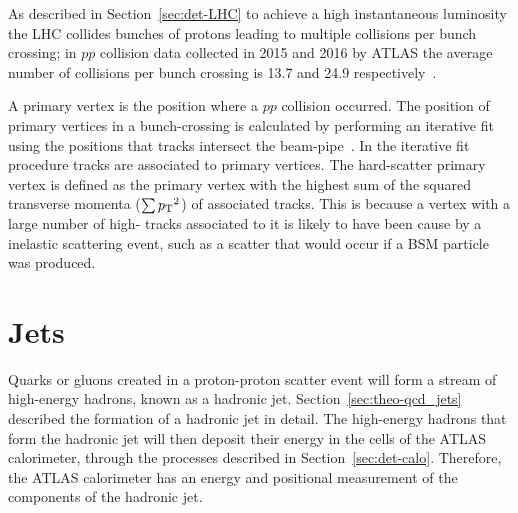 As described in Section~\ref{sec:det-LHC} to achieve a high instantaneous luminosity the LHC collides bunches of protons leading to multiple collisions per bunch crossing;
in $pp$ collision data collected in 2015 and 2016 by ATLAS the average number of collisions per bunch crossing is 13.7 and 24.9 respectively~\cite{det-ATLAS_lumi_twiki}.

A primary vertex is the position where a $pp$ collision occurred.
The position of primary vertices in a bunch-crossing is calculated by performing
an iterative fit using the positions that tracks intersect the beam-pipe~\cite{obj-tracks_pv}.
In the iterative fit procedure tracks are associated to primary vertices.
The hard-scatter primary vertex is defined as the primary vertex with the highest sum of the squared transverse momenta ($\sum {\ensuremath{p_{\mathrm{T}}}}^2$) of associated tracks.
This is because a vertex with a large number of high-\pT{} tracks associated to it is likely to have been cause by a
inelastic scattering event, such as a scatter that would occur if a BSM particle was produced.

\section{Jets}
\label{sec:obj-jets}

Quarks or gluons created in a proton-proton scatter event
will form a stream of high-energy hadrons, known as a hadronic jet.
Section~\ref{sec:theo-qcd_jets} described the formation of a hadronic jet in detail.
The high-energy hadrons that form the hadronic jet will then deposit their energy in the cells of the ATLAS calorimeter,
through the processes described in Section~\ref{sec:det-calo}.
Therefore, the ATLAS calorimeter has an energy and positional measurement of the components of the hadronic jet.



